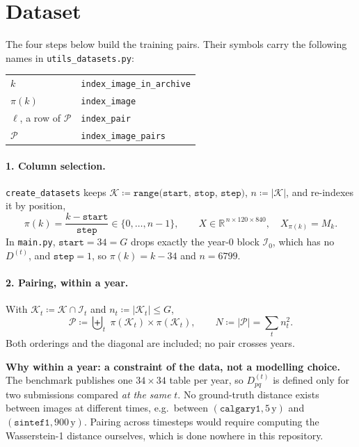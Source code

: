 \documentclass[11pt]{article}
\newcommand{\R}{\mathbb{R}}
\begin{document}
\section{Dataset}

The four steps below build the training pairs. Their symbols carry the
following names in \texttt{utils\_datasets.py}:
%
\begin{center}
\begin{tabular}{ll}
  \toprule
  $k$ & \texttt{index\_image\_in\_archive} \\
  $\pi(k)$ & \texttt{index\_image} \\
  $\ell$, a row of $\mathcal{P}$ & \texttt{index\_pair} \\
  $\mathcal{P}$ & \texttt{index\_image\_pairs} \\
  \bottomrule
\end{tabular}
\end{center}

\paragraph{1. Column selection.} \texttt{create\_datasets} keeps
$\mathcal{K} \coloneqq \texttt{range(start, stop, step)}$, $n \coloneqq
|\mathcal{K}|$, and re-indexes it by position,
%
\begin{equation}
  \pi(k) = \frac{k - \texttt{start}}{\texttt{step}} \in \{0, \dots, n-1\},
  \qquad
  X \in \R^{\,n \times 120 \times 840},
  \quad X_{\pi(k)} = M_k .
  \label{eq:selection}
\end{equation}
%
In \texttt{main.py}, $\texttt{start} = 34 = G$ drops exactly the year-$0$ block
$\mathcal{I}_0$, which has no $D^{(t)}$, and $\texttt{step} = 1$, so
$\pi(k) = k - 34$ and $n = 6799$.

\paragraph{2. Pairing, within a year.} With $\mathcal{K}_t \coloneqq
\mathcal{K} \cap \mathcal{I}_t$ and $n_t \coloneqq |\mathcal{K}_t| \le G$,
%
\begin{equation}
  \mathcal{P} \coloneqq
  \biguplus_{t} \; \pi(\mathcal{K}_t) \times \pi(\mathcal{K}_t),
  \qquad
  N \coloneqq |\mathcal{P}| = \sum_t n_t^2 .
  \label{eq:pairs}
\end{equation}
%
Both orderings and the diagonal are included; no pair crosses years.

\begingroup\color{red}
\noindent\textbf{Why within a year: a constraint of the data, not a modelling
choice.} The benchmark publishes one $34 \times 34$ table per year, so
$D^{(t)}_{pq}$ is defined only for two submissions compared \emph{at the same}
$t$. No ground-truth distance exists between images at different times, e.g.\
between $(\texttt{calgary1}, 5\,\mathrm{y})$ and
$(\texttt{sintef1}, 900\,\mathrm{y})$. Pairing across timesteps would require
computing the Wasserstein-1 distance ourselves, which is done nowhere in this
repository.
\endgroup
\end{document}
